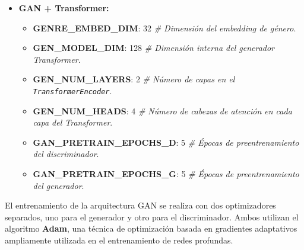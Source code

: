 \begin{itemize}
  \item \textbf{GAN + Transformer:}
  \begin{itemize}
    \item \textbf{GENRE\_EMBED\_DIM}: 32 \emph{\# Dimensión del embedding de género}.
    \item \textbf{GEN\_MODEL\_DIM}: 128 \emph{\# Dimensión interna del generador Transformer}.
    \item \textbf{GEN\_NUM\_LAYERS}: 2 \emph{\# Número de capas en el \texttt{TransformerEncoder}}.
    \item \textbf{GEN\_NUM\_HEADS}: 4 \emph{\# Número de cabezas de atención en cada capa del Transformer}.
    \item \textbf{GAN\_PRETRAIN\_EPOCHS\_D}: 5 \emph{\# Épocas de preentrenamiento del discriminador}.
    \item \textbf{GAN\_PRETRAIN\_EPOCHS\_G}: 5 \emph{\# Épocas de preentrenamiento del generador}.
  \end{itemize}
\end{itemize}

El entrenamiento de la arquitectura GAN se realiza con dos optimizadores separados, uno para el generador y otro para el discriminador. Ambos utilizan el algoritmo \textbf{Adam}, una técnica de optimización basada en gradientes adaptativos ampliamente utilizada en el entrenamiento de redes profundas.

